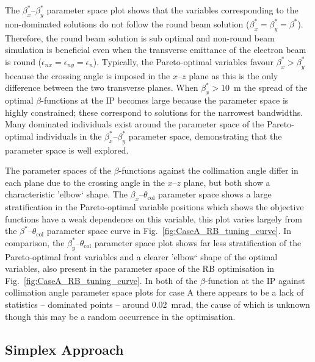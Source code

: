 \documentclass[../main.tex]{subfiles}
\begin{document}
The $\beta_{x}^{*}$--$\beta_{y}^{*}$ parameter space plot shows that the variables corresponding to the non-dominated solutions do not follow the round beam solution ($\beta_{x}^{*}=\beta_{y}^{*}=\beta^{*}$). Therefore, the round beam solution is sub optimal and non-round beam simulation is beneficial even when the transverse emittance of the electron beam is round ($\epsilon_{nx}=\epsilon_{ny}=\epsilon_{n}$). Typically, the Pareto-optimal variables favour $\beta_{x}^{*}>\beta_{y}^{*}$ because the crossing angle is imposed in the $x$--$z$ plane as this is the only difference between the two transverse planes. When $\beta_{x}^{*}>10$~\si{\meter} the spread of the optimal $\beta$-functions at the IP becomes large because the parameter space is highly constrained; these correspond to solutions for the narrowest bandwidths. Many dominated individuals exist around the parameter space of the Pareto-optimal individuals in the $\beta_{x}^{*}$--$\beta_{y}^{*}$ parameter space, demonstrating that the parameter space is well explored.

The parameter spaces  of the $\beta$-functions against the collimation angle differ in each plane due to the crossing angle in the $x$--$z$ plane, but both show a characteristic 'elbow` shape. The $\beta_{x}$--$\theta_{\mathrm{col}}$ parameter space shows a large stratification in the Pareto-optimal variable positions which shows the objective functions have a weak dependence on this variable, this plot varies largely from the $\beta^{*}$--$\theta_{\mathrm{col}}$ parameter space curve in Fig.~\ref{fig:CaseA_RB_tuning_curve}. In comparison, the $\beta_{y}^{*}$--$\theta_{\mathrm{col}}$ parameter space plot shows far less stratification of the Pareto-optimal front variables and a clearer  'elbow` shape of the optimal variables, also present in the parameter space of the RB optimisation in Fig.~\ref{fig:CaseA_RB_tuning_curve}. In both of the $\beta$-function at the IP against collimation angle parameter space plots for case A there appears to be a lack of statistics -- dominated points -- around 0.02~\si{\milli\radian}, the cause of which is unknown though this may be a random occurrence in the optimisation.    

\subsection{Simplex Approach}
\label{sec:simplex_optimisation}
\end{document}
